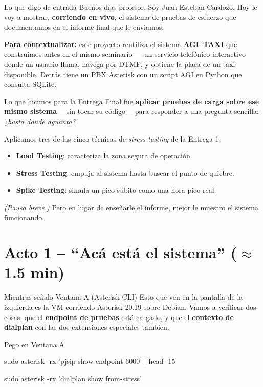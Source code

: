 \documentclass[11pt,letterpaper]{article}
\begin{document}
\begin{habla}{Lo que digo de entrada}
Buenos d\'ias profesor. Soy Juan Esteban Cardozo. Hoy le voy a mostrar, \textbf{corriendo en vivo}, el sistema de pruebas de esfuerzo que documentamos en el informe final que le enviamos.

\textbf{Para contextualizar:} este proyecto reutiliza el sistema \textbf{AGI--TAXI} que construimos antes en el mismo seminario --- un servicio telef\'onico interactivo donde un usuario llama, navega por DTMF, y obtiene la placa de un taxi disponible. Detr\'as tiene un PBX Asterisk con un script AGI en Python que consulta SQLite.

Lo que hicimos para la Entrega Final fue \textbf{aplicar pruebas de carga sobre ese mismo sistema} ---sin tocar su c\'odigo--- para responder a una pregunta sencilla: \textit{¿hasta d\'onde aguanta?}

Aplicamos tres de las cinco t\'ecnicas de \textit{stress testing} de la Entrega 1:
\begin{itemize}[leftmargin=1.5em, itemsep=0.2em]
  \item \textbf{Load Testing}: caracteriza la zona segura de operaci\'on.
  \item \textbf{Stress Testing}: empuja al sistema hasta buscar el punto de quiebre.
  \item \textbf{Spike Testing}: simula un pico s\'ubito como una hora pico real.
\end{itemize}

\textit{(Pausa breve.)} Pero en lugar de ense\~narle el informe, mejor le muestro el sistema funcionando.
\end{habla}

\section*{Acto 1 -- ``Acá está el sistema'' ($\approx$ 1.5 min)}

\begin{habla}{Mientras se\~nalo Ventana A (Asterisk CLI)}
Esto que ven en la pantalla de la izquierda es la VM corriendo Asterisk 20.19 sobre Debian. Vamos a verificar dos cosas: que el \textbf{endpoint de pruebas} est\'a cargado, y que el \textbf{contexto de dialplan} con las dos extensiones especiales tambi\'en.
\end{habla}

\begin{accion}{Pego en Ventana A}
\begin{comando}
sudo asterisk -rx 'pjsip show endpoint 6000' | head -15

sudo asterisk -rx 'dialplan show from-stress'
\end{comando}
\end{accion}
\end{document}
